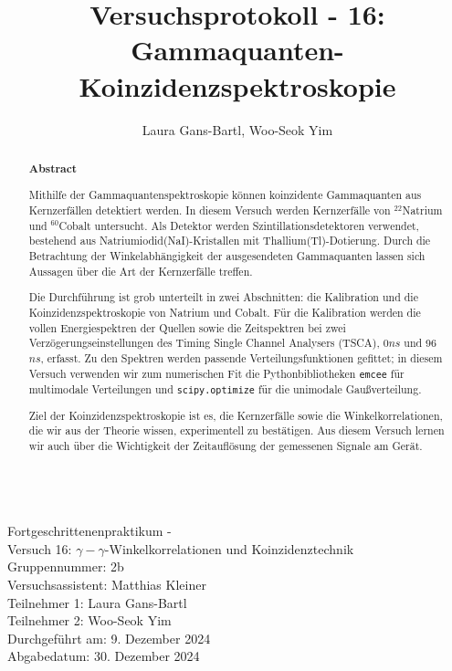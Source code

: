 \documentclass[%
aps,
onecolumn,
11pt,
tightenlines,
nofootinbib,
superscriptaddress,
floatfix,
prd,
]{revtex4-2}
\begin{document}
\title{\large Versuchsprotokoll - 16: Gammaquanten-Koinzidenzspektroskopie}

\author{Laura Gans-Bartl, Woo-Seok Yim}

\begin{abstract} 
	\vs{3mm}
	\centering
\begin{tcolorbox}
	\begin{center}		
		\textbf{Abstract}
	\end{center}\par
Mithilfe der Gammaquantenspektroskopie können koinzidente Gammaquanten aus Kernzerfällen detektiert werden. In diesem Versuch werden Kernzerfälle von $^{22}$Natrium und $^{60}$Cobalt untersucht. Als Detektor werden Szintillationsdetektoren verwendet, bestehend aus Natriumiodid(NaI)-Kristallen mit Thallium(Tl)-Dotierung. Durch die Betrachtung der Winkelabhängigkeit der ausgesendeten Gammaquanten lassen sich Aussagen über die Art der Kernzerfälle treffen.\par 
Die Durchführung ist grob unterteilt in zwei Abschnitten: die Kalibration und die Koinzidenzspektroskopie von Natrium und Cobalt. Für die Kalibration werden die vollen Energiespektren der Quellen sowie die Zeitspektren bei zwei Verzögerungseinstellungen des Timing Single Channel Analysers (TSCA), 0$ns$ und 96$ns$, erfasst. Zu den Spektren werden passende Verteilungsfunktionen gefittet; in diesem Versuch verwenden wir zum numerischen Fit die Pythonbibliotheken \texttt{emcee} für multimodale Verteilungen und \texttt{scipy.optimize} für die unimodale Gaußverteilung.\par
Ziel der Koinzidenzspektroskopie ist es, die Kernzerfälle sowie die Winkelkorrelationen, die wir aus der Theorie wissen, experimentell zu bestätigen. Aus diesem Versuch lernen wir auch über die Wichtigkeit der Zeitauflösung der gemessenen Signale am Gerät.
\end{tcolorbox}
\end{abstract}
\begin{center}
	\\
	{\fontsize{20}{10}\selectfont Fortgeschrittenenpraktikum - \\[5mm]
	Versuch 16: $\gamma - \gamma$-Winkelkorrelationen und Koinzidenztechnik\\ [10mm]
	Gruppennummer: 2b\\[5mm]
	Versuchsassistent: Matthias Kleiner\\[5mm]
	Teilnehmer 1: Laura Gans-Bartl \\[5mm]
	Teilnehmer 2: Woo-Seok Yim \\[5mm]
	Durchgeführt am: 9. Dezember 2024 \\[5mm]
	Abgabedatum: 30. Dezember 2024 }
\end{center}
\newpage
\maketitle
\newpage
\tableofcontents
\newpage
\end{document}
